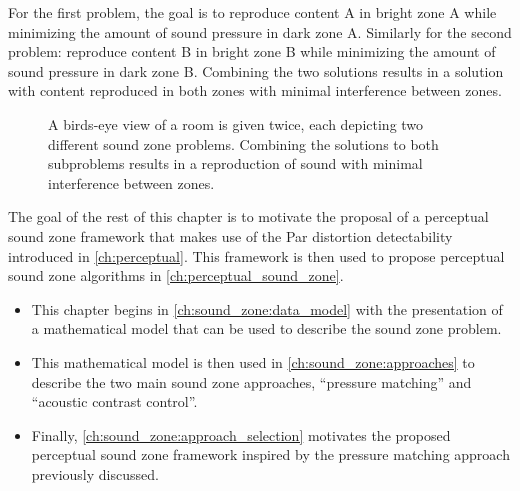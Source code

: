 For the first problem, the goal is to reproduce content A in bright zone A while minimizing 
the amount of sound pressure in dark zone A.
Similarly for the second problem: reproduce content B in bright zone B while minimizing the 
amount of sound pressure in dark zone B.
Combining the two solutions results in a solution with content reproduced in both zones with 
minimal interference between zones.

\begin{figure}[]
    \centering
    \begin{subfigure}{0.49\linewidth}
        \centering
        \scalebox{0.9}{}
    \end{subfigure}
    \begin{subfigure}{0.49\linewidth}
        \centering
        \scalebox{0.9}{}
    \end{subfigure}
    \caption{A birds-eye view of a room is given twice, each depicting two different sound zone problems. Combining the solutions to both subproblems results in a reproduction of sound with minimal interference between zones.}
    \label{fig:sound_zones:background:bright_dark_example}
\end{figure}

The goal of the rest of this chapter is to motivate the proposal of a perceptual sound zone framework that makes use
of the Par distortion detectability introduced in \autoref{ch:perceptual}.
This framework is then used to propose perceptual sound zone algorithms in \autoref{ch:perceptual_sound_zone}.
\begin{itemize}
    \item This chapter begins in \autoref{ch:sound_zone:data_model} with the presentation of  
        a mathematical model that can be used to describe the sound zone problem.
    \item This mathematical model is then used in \autoref{ch:sound_zone:approaches} 
        to describe the two main sound zone approaches, ``pressure matching'' and ``acoustic contrast control''.
    \item Finally, \autoref{ch:sound_zone:approach_selection} motivates the proposed perceptual sound zone framework
        inspired by the pressure matching approach previously discussed.
\end{itemize}

